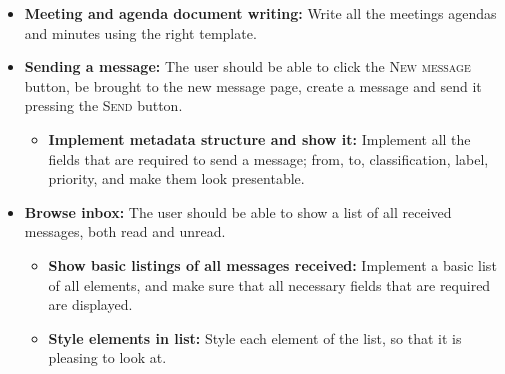 \begin{itemize}
\begin{itemize}
\end{itemize}
\item{}\textbf{Meeting and agenda document writing:} Write all the meetings agendas and minutes using the right template.
\item{}\textbf{Sending a message:} The user should be able to click the \textsc{New message} button, be brought to the new message page, create a message and send it pressing the \textsc{Send} button.
\begin{itemize}
\item{}\textbf{Implement metadata structure and show it:} Implement all the fields that are required to send a message; from, to, classification, label, priority, and make them look presentable.
\end{itemize}
\item{}\textbf{Browse inbox:} The user should be able to show a list of all received messages, both read and unread.
\begin{itemize}
\item{}\textbf{Show basic listings of all messages received:} Implement a basic list of all elements, and make sure that all necessary fields that are required are displayed.
\item{}\textbf{Style elements in list:} Style each element of the list, so that it is pleasing to look at.
\end{itemize}

\newpage


\end{itemize}
